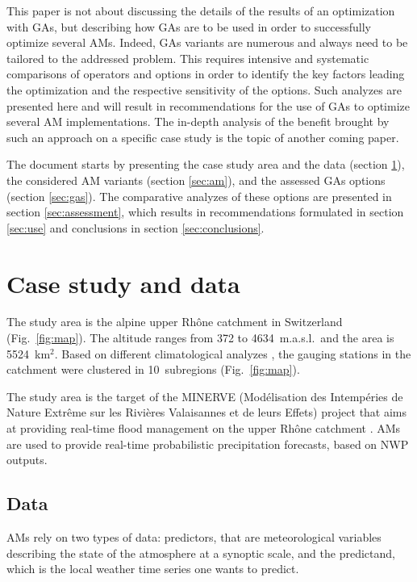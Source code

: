 \documentclass{ametsoc}
\begin{document}
This paper is not about discussing the details of the results of an optimization with GAs, but describing how GAs are to be used in order to successfully optimize several AMs. Indeed, GAs variants are numerous and always need to be tailored to the addressed problem. This requires intensive and systematic comparisons of operators and options in order to identify the key factors leading the optimization and the respective sensitivity of the options. Such analyzes are presented here and will result in recommendations for the use of GAs to optimize several AM implementations. The in-depth analysis of the benefit brought by such an approach on a specific case study is the topic of another coming paper. 

The document starts by presenting the case study area and the data (section \ref{sec:case_study_data}), the considered AM variants (section \ref{sec:am}), and the assessed GAs options (section \ref{sec:gas}). The comparative analyzes of these options are presented in section \ref{sec:assessment}, which results in recommendations formulated in section \ref{sec:use} and conclusions in section \ref{sec:conclusions}.


\section{Case study and data}
\label{sec:case_study_data}

The study area is the alpine upper Rh\^{o}ne catchment in Switzerland (Fig.\ \ref{fig:map}). The altitude ranges from 372 to 4634~m.a.s.l.\ and the area is 5524~km$^{2}$.  Based on different climatological analyzes \cite[see][for the details]{Horton2012a}, the gauging stations in the catchment were clustered in 10~subregions (Fig.\ \ref{fig:map}).

The study area is the target of the MINERVE (Mod\'{e}lisation des Intemp\'{e}ries de Nature Extr\^{e}me sur les Rivi\`{e}res Valaisannes et de leurs Effets) project that aims at providing real-time flood management on the upper Rh\^{o}ne catchment \citep{GarciaHernandez2009b}. AMs are used to provide real-time probabilistic precipitation forecasts, based on NWP outputs. 


\subsection{Data}
\label{sec:data}

AMs rely on two types of data: predictors, that are meteorological variables describing the state of the atmosphere at a synoptic scale, and the predictand, which is the local weather time series one wants to predict.
\end{document}
